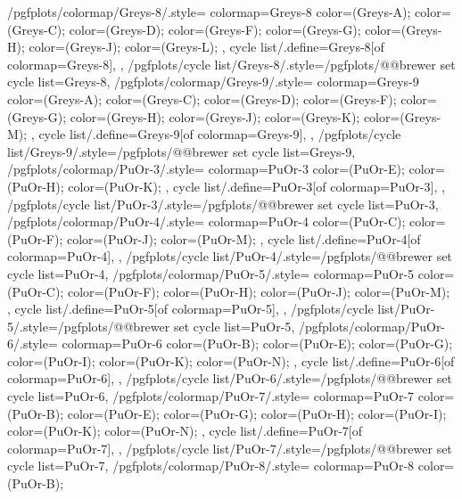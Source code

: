 {  %
  /pgfplots/colormap/Greys-8/.style={
    colormap={Greys-8}{
      color=(Greys-A);
      color=(Greys-C);
      color=(Greys-D);
      color=(Greys-F);
      color=(Greys-G);
      color=(Greys-H);
      color=(Greys-J);
      color=(Greys-L);
    },
    cycle list/.define={Greys-8}{[of colormap=Greys-8]},
  },
  /pgfplots/cycle list/Greys-8/.style={/pgfplots/@@brewer set cycle list={Greys-8}},
  /pgfplots/colormap/Greys-9/.style={
    colormap={Greys-9}{
      color=(Greys-A);
      color=(Greys-C);
      color=(Greys-D);
      color=(Greys-F);
      color=(Greys-G);
      color=(Greys-H);
      color=(Greys-J);
      color=(Greys-K);
      color=(Greys-M);
    },
    cycle list/.define={Greys-9}{[of colormap=Greys-9]},
  },
  /pgfplots/cycle list/Greys-9/.style={/pgfplots/@@brewer set cycle list={Greys-9}},
  /pgfplots/colormap/PuOr-3/.style={
    colormap={PuOr-3}{
      color=(PuOr-E);
      color=(PuOr-H);
      color=(PuOr-K);
    },
    cycle list/.define={PuOr-3}{[of colormap=PuOr-3]},
  },
  /pgfplots/cycle list/PuOr-3/.style={/pgfplots/@@brewer set cycle list={PuOr-3}},
  /pgfplots/colormap/PuOr-4/.style={
    colormap={PuOr-4}{
      color=(PuOr-C);
      color=(PuOr-F);
      color=(PuOr-J);
      color=(PuOr-M);
    },
    cycle list/.define={PuOr-4}{[of colormap=PuOr-4]},
  },
  /pgfplots/cycle list/PuOr-4/.style={/pgfplots/@@brewer set cycle list={PuOr-4}},
  /pgfplots/colormap/PuOr-5/.style={
    colormap={PuOr-5}{
      color=(PuOr-C);
      color=(PuOr-F);
      color=(PuOr-H);
      color=(PuOr-J);
      color=(PuOr-M);
    },
    cycle list/.define={PuOr-5}{[of colormap=PuOr-5]},
  },
  /pgfplots/cycle list/PuOr-5/.style={/pgfplots/@@brewer set cycle list={PuOr-5}},
  /pgfplots/colormap/PuOr-6/.style={
    colormap={PuOr-6}{
      color=(PuOr-B);
      color=(PuOr-E);
      color=(PuOr-G);
      color=(PuOr-I);
      color=(PuOr-K);
      color=(PuOr-N);
    },
    cycle list/.define={PuOr-6}{[of colormap=PuOr-6]},
  },
  /pgfplots/cycle list/PuOr-6/.style={/pgfplots/@@brewer set cycle list={PuOr-6}},
  /pgfplots/colormap/PuOr-7/.style={
    colormap={PuOr-7}{
      color=(PuOr-B);
      color=(PuOr-E);
      color=(PuOr-G);
      color=(PuOr-H);
      color=(PuOr-I);
      color=(PuOr-K);
      color=(PuOr-N);
    },
    cycle list/.define={PuOr-7}{[of colormap=PuOr-7]},
  },
  /pgfplots/cycle list/PuOr-7/.style={/pgfplots/@@brewer set cycle list={PuOr-7}},
  /pgfplots/colormap/PuOr-8/.style={
    colormap={PuOr-8}{
      color=(PuOr-B);
}}}
